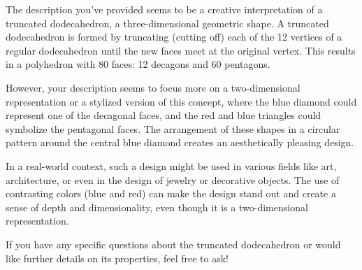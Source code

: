 The description you've provided seems to be a creative interpretation of a truncated dodecahedron, a three-dimensional geometric shape. A truncated dodecahedron is formed by truncating (cutting off) each of the 12 vertices of a regular dodecahedron until the new faces meet at the original vertex. This results in a polyhedron with 80 faces: 12 decagons and 60 pentagons.

However, your description seems to focus more on a two-dimensional representation or a stylized version of this concept, where the blue diamond could represent one of the decagonal faces, and the red and blue triangles could symbolize the pentagonal faces. The arrangement of these shapes in a circular pattern around the central blue diamond creates an aesthetically pleasing design.

In a real-world context, such a design might be used in various fields like art, architecture, or even in the design of jewelry or decorative objects. The use of contrasting colors (blue and red) can make the design stand out and create a sense of depth and dimensionality, even though it is a two-dimensional representation.

If you have any specific questions about the truncated dodecahedron or would like further details on its properties, feel free to ask!